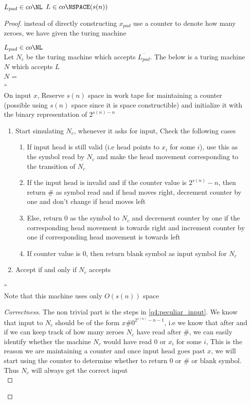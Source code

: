\begin{claim}\label{q4:coNL_to_coNSPACE}
    $L_{pad} \in co\NL$ \imp $L \in co\NSPACE(s(n))$
\end{claim}
\begin{proof}
    instead of directly constructing $x_{pad}$ use a counter to denote how many zeroes, we have given the turing machine

    $L_{pad} \in co\NL$\\
    Let $N_c$ be the turing machine which accepts $\overline{L_{pad}}$. The below is a turing machine $N$ which accepts $L$\\
    $N$ = \\
    ``\\
        On input $x$,
        Reserve $s(n)$ space in work tape for maintaining a counter (possible using $s(n)$ space since it is space constructible) and initialize it with the binary representation of $2^{s(n) - n}$
        \begin{enumerate}
            \item Start simulating $N_c$, whenever it asks for input, Check the following cases
            \begin{enumerate}\label{q4:peculiar_input}
                \item If input head is still valid (i.e head points to $x_i$ for some $i$), use this as the symbol read by $N_c$ and make the head movement corresponding to the transition of $N_c$
                \item If the input head is invalid and if the counter value is ${2^{s(n)} - n}$, then return \# as symbol read and if head moves right, decrement counter by one and don't change if head moves left
                \item Else, return 0 as the symbol to $N_c$ and decrement counter by one if the corresponding head movement is towards right and increment counter by one if corresponding head movement is towards left
                \item If counter value is 0, then return blank symbol as input symbol for $N_c$
            \end{enumerate}
            \item Accept if and only if $N_c$ accepts
        \end{enumerate}
    ``\\

    Note that this machine uses only $O(s(n))$ space\\
    \begin{proof}
        [Correctness]
        The non trivial part is the steps in \ref{q4:peculiar_input}. We know that input to $N_c$ should be of the form $x\#0^{2^{s(n)} - n - 1}$, i.e we know that after and if we can keep track of how many zeroes $N_c$ have read after \#, we can easily identify whether the machine $N_c$ would have read $0$ or $x_i$ for some $i$, This is the reason we are maintaining a counter and once input head goes past $x$, we will start using the counter to determine whether to return $0$ or \# or blank symbol. Thus $N_c$ will always get the correct input\\


\end{proof}
\end{proof}
